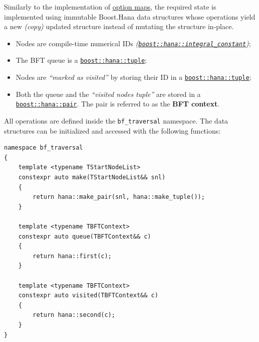 \documentclass[twoside, 12pt, a4paper, openright]{book}
\begin{document}
Similarly to the implementation of
\protect\hyperlink{metaprogramming_option_maps}{option maps}, the
required state is implemented using immutable Boost.Hana data structures
whose operations yield a new \emph{(copy)} updated structure instead of
mutating the structure in-place.

\begin{itemize}
\item
  Nodes are compile-time numerical IDs
  \emph{(\href{http://www.boost.org/doc/libs/1_61_0/libs/hana/doc/html/structboost_1_1hana_1_1integral__constant.html}{\texttt{boost::hana::integral_constant}})};
\item
  The BFT queue is a
  \href{http://www.boost.org/doc/libs/1_61_0/libs/hana/doc/html/structboost_1_1hana_1_1tuple.html}{\texttt{boost::hana::tuple}};
\item
  Nodes are \emph{``marked as visited''} by storing their ID in a
  \href{http://www.boost.org/doc/libs/1_61_0/libs/hana/doc/html/structboost_1_1hana_1_1tuple.html}{\texttt{boost::hana::tuple}};
\item
  Both the queue and the \emph{``visited nodes tuple''} are stored in a
  \href{http://www.boost.org/doc/libs/1_61_0/libs/hana/doc/html/structboost_1_1hana_1_1pair.html}{\texttt{boost::hana::pair}}.
  The pair is referred to as the \textbf{BFT context}.
\end{itemize}

All operations are defined inside the
\texttt{bf_traversal}
namespace. The data structures can be initialized and accessed with the
following functions:

\begin{verbatim}
namespace bf_traversal
{
    template <typename TStartNodeList>
    constexpr auto make(TStartNodeList&& snl)
    {
        return hana::make_pair(snl, hana::make_tuple());
    }

    template <typename TBFTContext>
    constexpr auto queue(TBFTContext&& c)
    {
        return hana::first(c);
    }

    template <typename TBFTContext>
    constexpr auto visited(TBFTContext&& c)
    {
        return hana::second(c);
    }
}
\end{verbatim}
\end{document}
